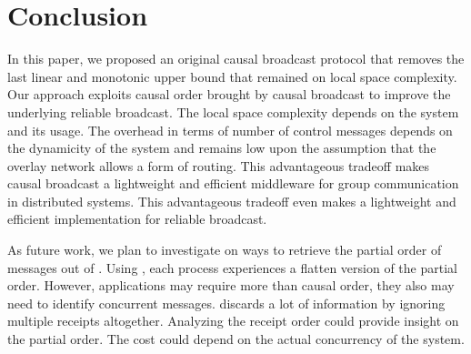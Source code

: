 
\section{Conclusion}
\label{sec:conclusion}


In this paper, we proposed an original causal broadcast protocol that removes
the last linear and monotonic upper bound that remained on local space
complexity. Our approach exploits causal order brought by causal broadcast to
improve the underlying reliable broadcast. The local space complexity depends on
the system and its usage. The overhead in terms of number of control messages
depends on the dynamicity of the system and remains low upon the assumption that
the overlay network allows a form of routing.
This advantageous tradeoff makes causal broadcast a lightweight and efficient
middleware for group communication in distributed systems. This advantageous
tradeoff even makes \RPCBROADCAST a lightweight and efficient implementation for
reliable broadcast. %

As future work, we plan to investigate on ways to retrieve the partial order of
messages out of \RPCBROADCAST. Using \RPCBROADCAST, each process experiences a
flatten version of the partial order. However, applications may require more
than causal order, they also may need to identify concurrent
messages. \RPCBROADCAST discards a lot of information by ignoring multiple
receipts altogether. Analyzing the receipt order could provide insight on the
partial order. The cost could depend on the actual concurrency of the system.

